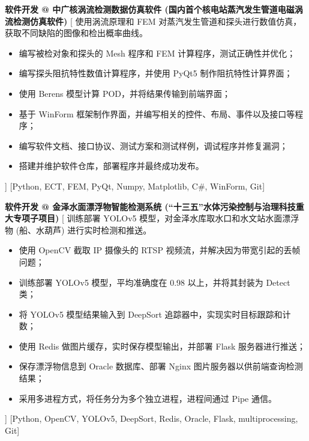 \begin{experiences}
    {\textbf{软件开发 @ 中广核涡流检测数据仿真软件 (国内首个核电站蒸汽发生管道电磁涡流检测仿真软件)}}%
    [
    使用涡流原理和 FEM 对蒸汽发生管道和探头进行数值仿真，获取不同缺陷的图像和检出概率曲线。
        \begin{itemize}
            \item {编写被检对象和探头的 Mesh 程序和 FEM 计算程序，测试正确性并优化；}
            \item {编写探头阻抗特性数值计算程序，并使用 PyQt5 制作阻抗特性计算界面；}
            \item {使用 Berens 模型计算 POD，并将结果传输到前端界面；}
            \item {基于 WinForm 框架制作界面，并编写相关的控件、布局、事件以及接口等程序；}
            \item {编写软件文档、接口协议、测试方案和测试样例，调试程序并修复漏洞；}
            \item {搭建并维护软件仓库，部署程序并最终成功发布。}
        \end{itemize}
    ]
    [Python, ECT, FEM, PyQt, Numpy, Matplotlib, C\#, WinForm, Git]
    \separator{0.5ex}

    {\textbf{软件开发 @ 金泽水面漂浮物智能检测系统 (``十三五''水体污染控制与治理科技重大专项子项目)}}%
    [
    训练部署 YOLOv5 模型，对金泽水库取水口和水文站水面漂浮物 (船、水葫芦) 进行实时检测和推送。
        \begin{itemize}
            \item {使用 OpenCV 截取 IP 摄像头的 RTSP 视频流，并解决因为带宽引起的丢帧问题；}
            \item {训练部署 YOLOv5 模型，平均准确度在 0.98 以上，并将其封装为 Detect 类；}
            \item {将 YOLOv5 模型结果输入到 DeepSort 追踪器中，实现实时目标跟踪和计数；}
            \item {使用 Redis 做图片缓存，实时保存模型输出，并部署 Flask 服务器进行推送；}
            \item {保存漂浮物信息到 Oracle 数据库、部署 Nginx 图片服务器以供前端查询检测结果；}
            \item {采用多进程方式，将任务分为多个独立进程，进程间通过 Pipe 通信。}
        \end{itemize}]
    [Python, OpenCV, YOLOv5, DeepSort, Redis, Oracle, Flask, multiprocessing, Git]
\end{experiences}